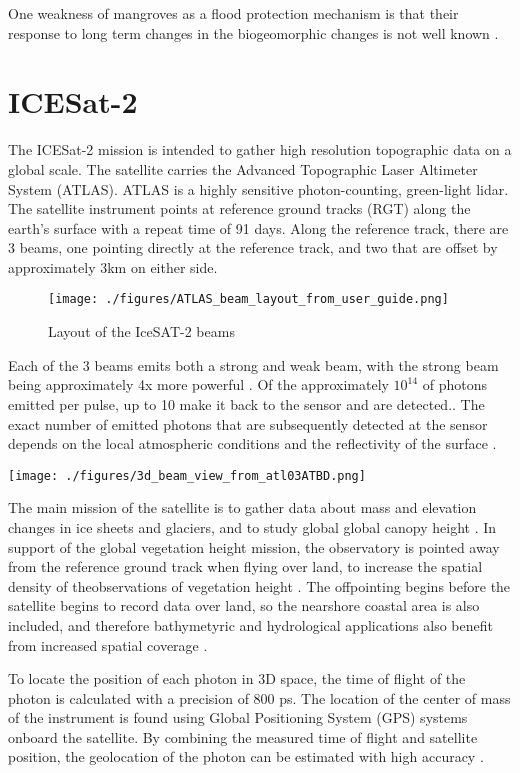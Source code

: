 One weakness of mangroves as a flood protection mechanism is that their response to long term changes in the biogeomorphic changes is not well known \cite{Gijsman2021}.

\section{ICESat-2}

The ICESat-2 mission is intended to gather high resolution topographic data on a global scale. The satellite carries the Advanced Topographic Laser Altimeter System (ATLAS). ATLAS is a highly sensitive photon-counting, green-light lidar. The satellite instrument points at reference ground tracks (RGT) along the earth's surface with a repeat time of 91 days. Along the reference track, there are 3 beams, one pointing directly at the reference track, and two that are offset by approximately 3km on either side.

\begin{figure}
      \centering
      \texttt{[image: ./figures/ATLAS\_beam\_layout\_from\_user\_guide.png]}
      \caption{Layout of the IceSAT-2 beams}
\end{figure}

Each of the 3 beams emits both a strong and weak beam, with the strong beam being approximately 4x more powerful \cite{Neumann2019d}. Of the approximately \(10^{14}\) of photons emitted per pulse, up to  10 make it back to the sensor and are detected.\cite{Neumann2019d}. The exact number of emitted photons that are subsequently detected at the sensor depends on the local atmospheric conditions and the reflectivity of the surface \cite{Neumann2019e}.

\texttt{[image: ./figures/3d\_beam\_view\_from\_atl03ATBD.png]}\cite{Neumann2019d}

The main mission of the satellite is to gather data about mass and elevation changes in ice sheets and glaciers, and to study global global canopy height \cite{Markus2017}. In support of the global vegetation height mission, the observatory is pointed away from the reference ground track when flying over land, to increase the spatial density of theobservations of vegetation height \cite{Markus2017}. The offpointing begins before the satellite begins to record data over land, so the nearshore coastal area is also included, and therefore bathymetyric and hydrological applications also benefit from increased spatial coverage \cite{Magruder2021}.

To locate the position of each photon in 3D space, the time of flight of the photon is calculated with a precision of 800 ps\cite{Neumann2019d}. The location of the center of mass of the instrument is found using Global Positioning System (GPS) systems onboard the satellite. By combining the measured time of flight and satellite position, the geolocation of the photon can be estimated with high accuracy \cite{Neumann2019d}.

